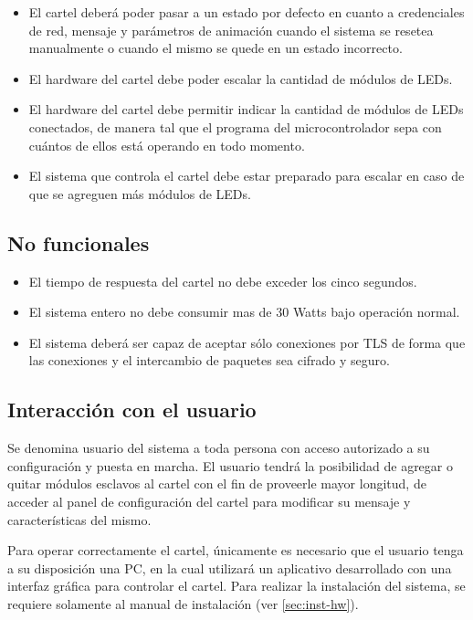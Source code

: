 \begin{itemize}
	\item El cartel deberá poder pasar a un estado por defecto en cuanto a credenciales de red, mensaje y parámetros de animación cuando el sistema se resetea manualmente o cuando el mismo se quede en un estado incorrecto.
	\item El hardware del cartel debe poder escalar la cantidad de módulos de LEDs.
	\item El hardware del cartel debe permitir indicar la cantidad de módulos de LEDs conectados, de manera tal que el programa del microcontrolador sepa con cuántos de ellos está operando en todo momento.
	\item El sistema que controla el cartel debe estar preparado para escalar en caso de que se agreguen más módulos de LEDs.
\end{itemize}

\subsection{No funcionales}
\begin{itemize}
	\item El tiempo de respuesta del cartel no debe exceder los cinco segundos.
	\item El sistema entero no debe consumir mas de 30 Watts bajo operación normal.
	\item El sistema deberá ser capaz de aceptar sólo conexiones por TLS \cite{TLS} de forma que las conexiones y el intercambio de paquetes sea cifrado y seguro.
\end{itemize}

\subsection{Interacción con el usuario}
	
	Se denomina usuario del sistema a toda persona con acceso autorizado a su configuración y puesta en marcha.	El usuario tendrá la posibilidad de agregar o quitar módulos esclavos al cartel con el fin de proveerle mayor longitud, de acceder al panel de configuración del cartel para modificar su mensaje y características del mismo.
	
	Para operar correctamente el cartel, únicamente es necesario que el usuario tenga a su disposición una PC, en la cual utilizará un aplicativo desarrollado con una interfaz gráfica para controlar el cartel. Para realizar la instalación del sistema, se requiere solamente al manual de instalación (ver \ref{sec:inst-hw}).

